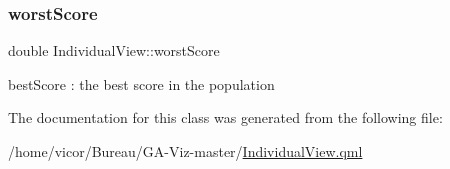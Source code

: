 \mbox{\label{class_individual_view_a65da50c477212f4969c5a2a1e87c1d82}} 
\subsubsection{\texorpdfstring{worst\+Score}{worstScore}}
{\footnotesize\ttfamily double Individual\+View\+::worst\+Score}

best\+Score \+: the best score in the population 

The documentation for this class was generated from the following file\+:\begin{DoxyCompactItemize}
\item 
/home/vicor/\+Bureau/\+G\+A-\/\+Viz-\/master/\hyperlink{_individual_view_8qml}{Individual\+View.\+qml}\end{DoxyCompactItemize}

